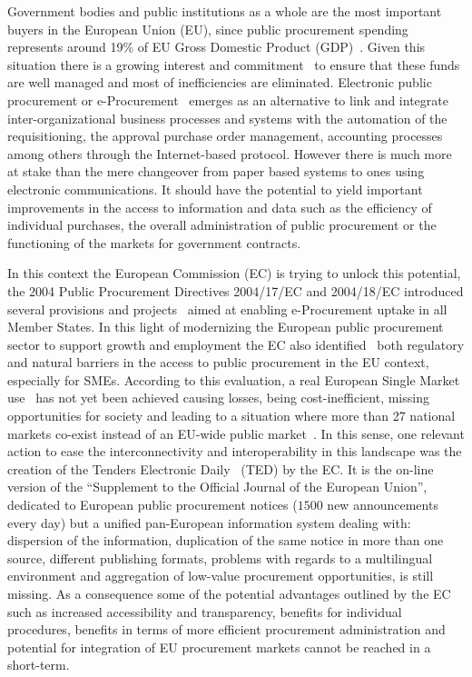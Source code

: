 Government bodies and public institutions as a whole are the most important buyers in the European Union (EU), since public procurement spending represents around 19\% of 
EU Gross Domestic Product (GDP)~\cite{d2010}. Given this situation there is a growing interest and commitment~\cite{d2010a} to ensure that these funds are 
well managed and most of inefficiencies are eliminated. Electronic public procurement or e-Procurement~\cite{Podlogar2007} emerges as an alternative to link and 
integrate inter-organizational business processes and systems with the automation of the requisitioning, the approval purchase order 
management, accounting processes among others through the Internet-based protocol. However there is much more at stake than the mere changeover 
from paper based systems to ones using electronic communications. It should have the potential to yield important improvements in the access to information and data such as the efficiency of individual purchases, 
the overall administration of public procurement or the functioning of the markets for government contracts. 

In this context the European Commission (EC) is trying to unlock this potential, the 2004 Public Procurement Directives 2004/17/EC and 2004/18/EC 
introduced several provisions and projects~\cite{peppol,e-certis} aimed at enabling e-Procurement uptake in all Member States. In this light of 
modernizing the European public procurement sector to support growth and employment the EC also identified~\cite{siemensEval} 
both regulatory and natural barriers in the access to public procurement in the EU context, especially for SMEs. 
According to this evaluation, a real European Single Market use~\cite{d2011} has not yet been achieved causing losses, 
being cost-inefficient, missing opportunities for society and leading to a situation where more than 27 national markets co-exist instead of an EU-wide public market~\cite{monti2010}. 
In this sense, one relevant action to ease the interconnectivity and interoperability in this landscape was the creation of the Tenders Electronic Daily~\cite{eNotices,formsTed} (TED) 
by the EC. It is the on-line version of the ``Supplement to the Official Journal of the European Union'', dedicated to European public procurement notices 
($1500$ new announcements every day) but a unified pan-European information system dealing with: dispersion of the information, 
duplication of the same notice in more than one source, different publishing formats, problems with regards to a multilingual environment and 
aggregation of low-value procurement opportunities, is still missing. As a consequence some of the potential advantages 
outlined by the EC~\cite{d2010} such as increased accessibility and transparency, benefits for individual procedures, 
benefits in terms of more efficient procurement administration and potential for integration of EU procurement markets cannot be reached in a 
short-term.

